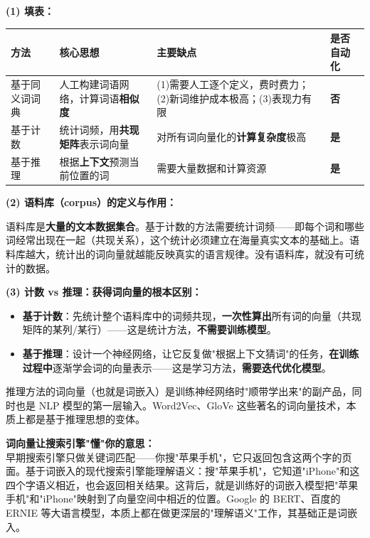 \documentclass[a4paper,11pt]{ctexart}
\begin{document}
\begin{solutionbox}[参考答案与详细解析]
    \textbf{(1) 填表：}

    \begin{center}
    \begin{tabular}{p{3.0cm} p{3.5cm} p{4.5cm} p{2.5cm}}
        \toprule
        方法 & 核心思想 & 主要缺点 & 是否自动化 \\
        \midrule
        基于同义词词典 & 人工构建词语网络，计算词语\textbf{相似度} & (1)需要人工逐个定义，费时费力；(2)新词维护成本极高；(3)表现力有限 & \textbf{否} \\[0.5em]
        基于计数 & 统计词频，用\textbf{共现矩阵}表示词向量 & 对所有词向量化的\textbf{计算复杂度}极高 & \textbf{是} \\[0.5em]
        基于推理 & 根据\textbf{上下文}预测当前位置的词 & 需要大量数据和计算资源 & \textbf{是} \\
        \bottomrule
    \end{tabular}
    \end{center}

    \textbf{(2) 语料库（corpus）的定义与作用：}

    语料库是\textbf{大量的文本数据集合}。基于计数的方法需要统计词频——即每个词和哪些词经常出现在一起（共现关系），这个统计必须建立在海量真实文本的基础上。语料库越大，统计出的词向量就越能反映真实的语言规律。没有语料库，就没有可统计的数据。

    \textbf{(3) 计数 vs 推理：获得词向量的根本区别：}

    \begin{keybox}[核心对比]
        \begin{itemize}
            \item \textbf{基于计数}：先统计整个语料库中的词频共现，\textbf{一次性算出}所有词的向量（共现矩阵的某列/某行）——这是统计方法，\textbf{不需要训练模型}。
            \item \textbf{基于推理}：设计一个神经网络，让它反复做"根据上下文猜词"的任务，\textbf{在训练过程中}逐渐学会词的向量表示——这是学习方法，\textbf{需要迭代优化模型}。
        \end{itemize}
        推理方法的词向量（也就是词嵌入）是训练神经网络时"顺带学出来"的副产品，同时也是 NLP 模型的第一层输入。Word2Vec、GloVe 这些著名的词向量技术，本质上都是基于推理思想的变体。
    \end{keybox}
\end{solutionbox}

\begin{appbox}[现实应用场景]
    \textbf{词向量让搜索引擎"懂"你的意思：}\\
    早期搜索引擎只做关键词匹配——你搜"苹果手机"，它只返回包含这两个字的页面。基于词嵌入的现代搜索引擎能理解语义：搜"苹果手机"，它知道"iPhone"和这四个字语义相近，也会返回相关结果。这背后，就是训练好的词嵌入模型把"苹果手机"和"iPhone"映射到了向量空间中相近的位置。Google 的 BERT、百度的 ERNIE 等大语言模型，本质上都在做更深层的"理解语义"工作，其基础正是词嵌入。
\end{appbox}
\end{document}
